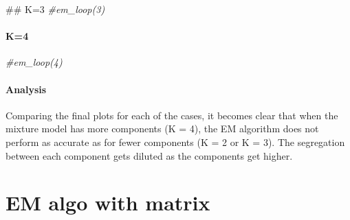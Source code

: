 \documentclass[]{article}
\newenvironment{Shaded}{\begin{snugshade}}{\end{snugshade}}
\newcommand{\CommentTok}[1]{\textcolor[rgb]{0.56,0.35,0.01}{\textit{#1}}}
\newcommand{\NormalTok}[1]{#1}
\let\oldparagraph\paragraph
\renewcommand{\paragraph}[1]{\oldparagraph{#1}\mbox{}}
\begin{document}
\begin{Shaded}
\begin{Highlighting}[]
\NormalTok{## K=3}
\CommentTok{#em_loop(3)}
\end{Highlighting}
\end{Shaded}

\paragraph{K=4}\label{k4}

\begin{Shaded}
\begin{Highlighting}[]
\CommentTok{#em_loop(4)}
\end{Highlighting}
\end{Shaded}

\paragraph{Analysis}\label{analysis}

Comparing the final plots for each of the cases, it becomes clear that
when the mixture model has more components (K = 4), the EM algorithm
does not perform as accurate as for fewer components (K = 2 or K = 3).
The segregation between each component gets diluted as the components
get higher.

\section{EM algo with matrix}\label{em-algo-with-matrix}
\end{document}
